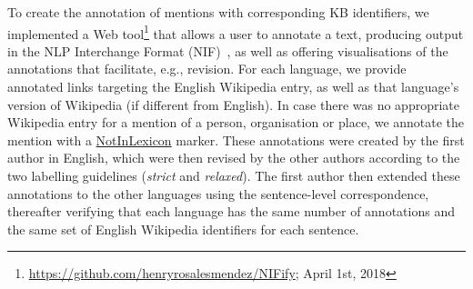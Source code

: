 \documentclass{llncs}
\begin{document}

To create the annotation of mentions with corresponding KB identifiers, we implemented a Web tool\footnote{\url{https://github.com/henryrosalesmendez/NIFify}; April 1st, 2018} that allows a user to annotate a text, producing output in the NLP Interchange Format (NIF)~\cite{HellmannLAB13}, as well as offering visualisations of the annotations that facilitate, e.g., revision. For each language, we provide annotated links targeting the English Wikipedia entry, as well as that language's version of Wikipedia (if different from English). In case there was no appropriate Wikipedia entry for a mention of a person, organisation or place, we annotate the mention with a \url{NotInLexicon} marker. These annotations were created by the first author in English, which were then revised by the other authors according to the two labelling guidelines (\textit{strict} and \textit{relaxed}). The first author then extended these annotations to the other languages using the sentence-level correspondence, thereafter verifying that each language has the same number of annotations and the same set of English Wikipedia identifiers for each sentence.
\end{document}
